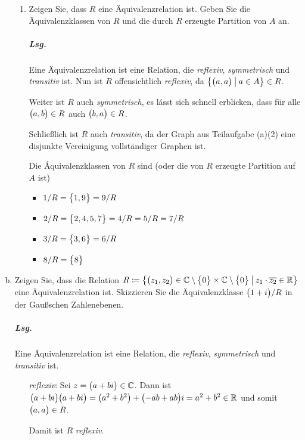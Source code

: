 \documentclass{scrreprt}
\begin{document}
\begin{enumerate}[(a)]
\begin{enumerate}[(1)]
  \setcounter{enumii}{0}
  \item Zeigen Sie, dass $R$ eine Äquivalenzrelation ist.
    Geben Sie die Äquivalenzklassen von $R$ und die durch $R$ erzeugte
    Partition von $A$ an.

    \subparagraph{Lsg.} Eine Äquivalenzrelation ist eine Relation, die
    \emph{reflexiv}, \emph{symmetrisch} und \emph{transitiv} ist.
    Nun ist $R$ offensichtlich \emph{reflexiv}, da
    $\qty{\qty\big(a, a) \:\middle|\: a \in A} \in R$.

    Weiter ist $R$ auch \emph{symmetrisch}, es lásst sich schnell erblicken, dass
    für alle $\qty\big(a, b) \in R$ auch $\qty\big(b, a) \in R$.

    Schließlich ist $R$ auch \emph{transitiv}, da der Graph aus Teilaufgabe
    (a)(2) eine disjunkte Vereinigung vollständiger Graphen ist.

    Die Áquivalenzklassen von $R$ sind (oder die von $R$ erzeugte Partition auf
    $A$ ist)
    \begin{itemize}
    \item $1 / R = \qty\big{1, 9} = 9 / R$
    \item $2 / R = \qty\big{2, 4, 5, 7} = 4 / R = 5 / R = 7 / R$
    \item $3 / R = \qty\big{3, 6} = 6 / R$
    \item $8 / R = \qty\big{8}$
    \end{itemize}
  \end{enumerate}

\newpage
\item Zeigen Sie, dass die Relation $R \coloneqq \qty{
    \qty\big(z_1, z_2) \in \mathbb{C} \setminus \qty\big{0} \times
    \mathbb{C} \setminus \qty\big{0}
    \:\middle|\: z_1 \cdot \overline{z_2} \in \mathbb{R}
  }$ eine Äquivalenzrelation ist.
  Skizzieren Sie die Äquivalenzklasse $\qty\big(1 + i) / R$ in der Gaußschen
  Zahlenebenen.

  \subparagraph{Lsg.} Eine Äquivalenzrelation ist eine Relation, die
  \emph{reflexiv}, \emph{symmetrisch} und \emph{transitiv} ist.
  \begin{itemize}
  \item[\emph{reflexiv}:] Sei $z = \qty\big(a + bi) \in \mathbb{C}$.
    Dann ist $\qty\big(a + bi)\qty\big(a + bi) =
    \qty\big(a^2 + b^2) + \qty\big(-ab + ab)i
    = a^2 + b^2 \in \mathbb{R}$ und somit $\qty\big(a, a) \in R$.

    Damit ist $R$ \emph{reflexiv}.


\end{itemize}
\end{enumerate}
\end{document}
